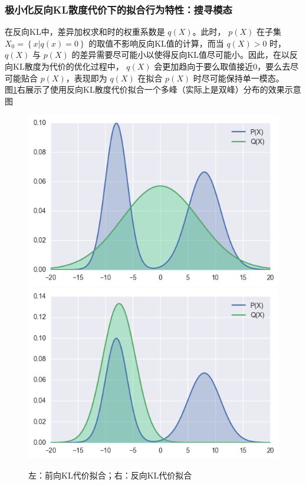 \documentclass[12pt,a4paper,UTF8]{article}
\begin{document}
\subsubsection{极小化反向KL散度代价下的拟合行为特性：搜寻模态}
\indent 在反向KL中，差异加权求和时的权重系数是 $q\left(X\right)$。此时， $p\left(X\right)$ 在子集 $X_0=\left\{x|q\left(x\right)=0\right\}$ 的取值不影响反向KL值的计算，而当 $q\left(X\right)>0$ 时， $q\left(X\right)$ 与 $p\left(X\right)$ 的差异需要尽可能小以使得反向KL值尽可能小。因此，在以反向KL散度为代价的优化过程中， $q\left(X\right)$ 会更加趋向于要么取值接近0，要么去尽可能贴合 $p\left(X\right)$，表现即为 $q\left(X\right)$ 在拟合 $p\left(X\right)$ 时尽可能保持单一模态。\\
\indent 图\ref{kl_img}右展示了使用反向KL散度代价拟合一个多峰（实际上是双峰）分布的效果示意图

\begin{figure}[htb]\centering\includegraphics[scale=0.6]{./figure/1.png}\includegraphics[scale=0.6]{./figure/2.png}\caption{左：前向KL代价拟合；右：反向KL代价拟合}\label{kl_img}\end{figure}
\end{document}
